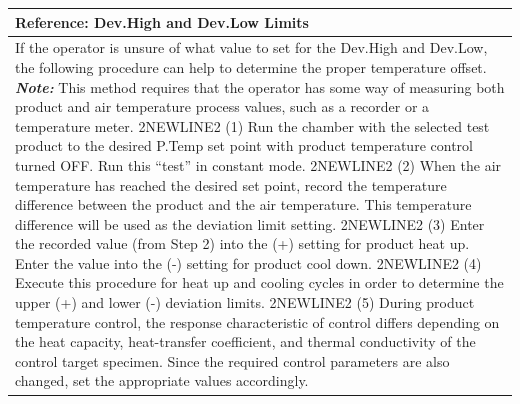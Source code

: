 \begin{longtable}[]{@{}l@{}}
\toprule
\begin{minipage}[b]{0.97\columnwidth}\raggedright
\textbf{Reference}: Dev.High and Dev.Low Limits\strut
\end{minipage}\tabularnewline
\midrule
\endhead
\begin{minipage}[t]{0.97\columnwidth}\raggedright
If the operator is unsure of what value to set for the Dev.High and
Dev.Low, the following procedure can help to determine the proper
temperature offset. \textbf{\emph{Note:}} This method requires that the
operator has some way of measuring both product and air temperature
process values, such as a recorder or a temperature meter. 2NEWLINE2 (1)
Run the chamber with the selected test product to the desired P.Temp set
point with product temperature control turned OFF. Run this ``test'' in
constant mode. 2NEWLINE2 (2) When the air temperature has reached the
desired set point, record the temperature difference between the product
and the air temperature. This temperature difference will be used as the
deviation limit setting. 2NEWLINE2 (3) Enter the recorded value (from
Step 2) into the (+) setting for product heat up. Enter the value into
the (-) setting for product cool down. 2NEWLINE2 (4) Execute this
procedure for heat up and cooling cycles in order to determine the upper
(+) and lower (-) deviation limits. 2NEWLINE2 (5) During product
temperature control, the response characteristic of control differs
depending on the heat capacity, heat-transfer coefficient, and thermal
conductivity of the control target specimen. Since the required control
parameters are also changed, set the appropriate values
accordingly.\strut
\end{minipage}\tabularnewline
\bottomrule
\end{longtable}

